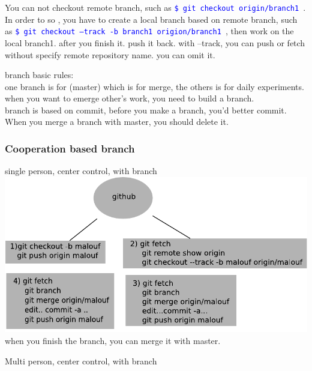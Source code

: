 \documentclass[a4paper,12pt,twoside]{book}
\newcommand{\linuxcommand}[1]{\texttt{\textcolor{blue}{\$ #1 \Pisymbol{psy}{191}}}}
\begin{document}
You can not checkout remote branch, such as \linuxcommand{git checkout origin/branch1}. In order to so , you
have to create a local branch based on remote branch, such as \linuxcommand{git checkout --track -b branch1
origion/branch1}, then work on the local branch1. after you finish it. push it back. with --track, you can push or
fetch without specify remote repository name. you can omit it.


branch basic rules:\\
one branch is for (master) which is for merge, the others is for daily experiments. when you want to emerge
other's work, you need to build a branch.\\

branch is based on commit, before you make a branch, you'd better commit.\\

When you merge a branch with master, you should delete it.



\subsubsection{Cooperation based branch }
single person, center control, with branch \\
	\includegraphics[scale=0.6]{pics/git_branch} \\
   	when you finish the branch, you can merge it with master.

Multi person, center control, with branch \\
\end{document}

